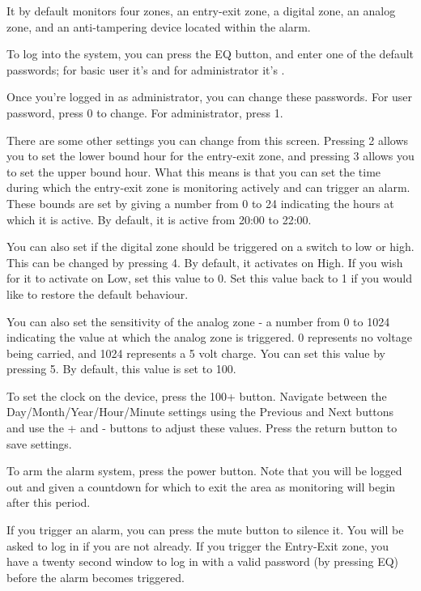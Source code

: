 \documentclass[a4paper,11pt]{article}
\theoremstyle{mytheor}
\begin{document}
It by default monitors four zones, an entry-exit zone, a digital zone, an analog zone, and an anti-tampering device located within the alarm.

To log into the system, you can press the EQ button, and enter one of the default passwords; for basic user it's {} and for administrator it's {}.

Once you're logged in as administrator, you can change these passwords. For user password, press 0 to change. For administrator, press 1.

There are some other settings you can change from this screen. Pressing 2 allows you to set the lower bound hour for the entry-exit zone, and pressing 3 allows you to set the upper bound hour. What this means is that you can set the time during which the entry-exit zone is monitoring actively and can trigger an alarm. These bounds are set by giving a number from 0 to 24 indicating the hours at which it is active. By default, it is active from 20:00 to 22:00.

You can also set if the digital zone should be triggered on a switch to low or high. This can be changed by pressing 4. By default, it activates on High. If you wish for it to activate on Low, set this value to 0. Set this value back to 1 if you would like to restore the default behaviour.

You can also set the sensitivity of the analog zone - a number from 0 to 1024 indicating the value at which the analog zone is triggered. 0 represents no voltage being carried, and 1024 represents a 5 volt charge. You can set this value by pressing 5. By default, this value is set to 100.

To set the clock on the device, press the 100+ button. Navigate between the Day/Month/Year\-/Hour/Minute settings using the Previous and Next buttons and use the + and - buttons to adjust these values. Press the return button to save settings.

To arm the alarm system, press the power button. Note that you will be logged out and given a countdown for which to exit the area as monitoring will begin after this period.

If you trigger an alarm, you can press the mute button to silence it. You will be asked to log in if you are not already. If you trigger the Entry-Exit zone, you have a twenty second window to log in with a valid password (by pressing EQ) before the alarm becomes triggered.
\end{document}
